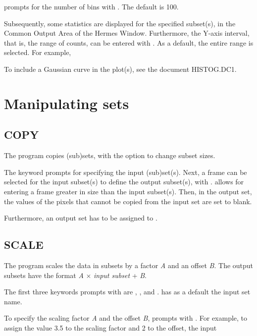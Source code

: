 
 prompts for the number of bins with . The
default is 100.

Subsequently, some statistics are displayed for the specified subset(s),
in the Common Output Area of the Hermes Window. 
Furthermore, the Y-axis interval, that is, the range of counts, can be
entered with .  As a default, the entire range is
selected.  For example,


To include a Gaussian curve in the plot(s), see the document HISTOG.DC1. 

\section{Manipulating sets}

\subsection*{COPY}

The program  copies (sub)sets, with the option to change
subset sizes. 

The keyword  prompts for specifying the input
(sub)set(s).  Next, a frame can be selected for the input subset(s) to
define the output subset(s), with .   allows
for entering a frame greater in size than the input subset(s).  Then, in
the output set, the values of the pixels that cannot be copied from the
input set are set to blank. 

Furthermore, an output set has to be assigned to .  

\subsection*{SCALE}

The program  scales the data in subsets by a factor {\em
A} and an offset {\em B}.  The output subsets have the format {\em A}
$\times$ {\em input subset} + {\em B}. 

The first three keywords  prompts with are
, , and . 
 has as a default the input set name. 

To specify the scaling factor {\em A} and the offset {\em B},
 prompts with .  For example, to assign the
value 3.5 to the scaling factor and 2 to the offset, the input

